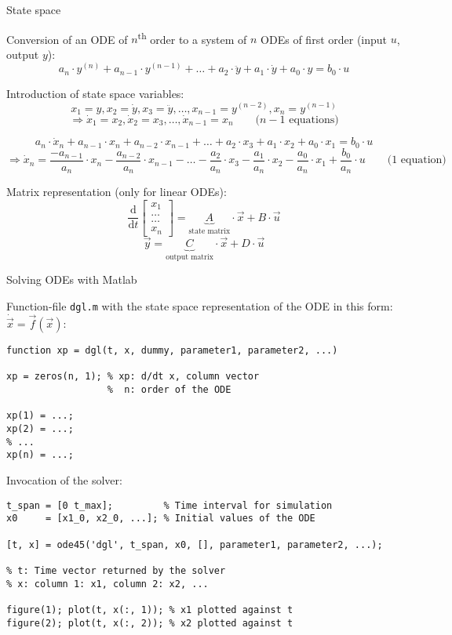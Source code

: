 \documentclass[a4paper,fontsize=11pt,parskip]{scrartcl}
\begin{document}
{\Large State space}

Conversion of an ODE of $n$\textsuperscript{th} order to a system of $n$ ODEs of first order (input $u$, output $y$):\\
\[a_n\cdot y^{(n)}+a_{n-1}\cdot y^{(n-1)}+\dots+a_2\cdot\ddot y+a_1\cdot\dot y+a_0\cdot y=b_0\cdot u\]

Introduction of state space variables:\\
\[x_1 = y, x_2 = \dot y, x_3 = \ddot y, \dots, x_{n-1} = y^{(n-2)}, x_n=y^{(n-1)}\]
\[\Rightarrow \dot x_1 = x_2, \dot x_2 = x_3, \dots, \dot x_{n-1} = x_n\qquad \text{(}n-1\text{ equations)}\]

\[a_n\cdot\dot x_n+a_{n-1}\cdot x_n+a_{n-2}\cdot x_{n-1}+\dots+a_2\cdot x_3+a_1\cdot x_2+a_0\cdot x_1=b_0\cdot u\]
\[\Rightarrow \dot x_n = \frac{-a_{n-1}}{a_n}\cdot x_n-\frac{a_{n-2}}{a_n}\cdot x_{n-1}-\dots-\frac{a_2}{a_n}\cdot x_3-\frac{a_1}{a_n}\cdot x_2-\frac{a_0}{a_n}\cdot x_1+\frac{b_0}{a_n}\cdot u\qquad \text{(1 equation)}\]

Matrix representation (only for linear ODEs):
\[\frac{\mathrm{d}}{\mathrm{d}t}\begin{bmatrix}x_1\\\dots\\\dots\\x_n\end{bmatrix}=\underbrace{A}_\text{state matrix}\cdot\vec x+B\cdot\vec u\]
\[\vec y=\underbrace{C}_\text{output matrix}\cdot\vec x+D\cdot\vec u\]

{\Large Solving ODEs with Matlab}

Function-file \texttt{dgl.m} with the state space representation of the ODE in this form: $\dot{\vec x}=\vec f(\vec x)$:
\begin{lstlisting}
function xp = dgl(t, x, dummy, parameter1, parameter2, ...)

xp = zeros(n, 1); % xp: d/dt x, column vector
                  %  n: order of the ODE

xp(1) = ...;
xp(2) = ...;
% ...
xp(n) = ...;
\end{lstlisting}

Invocation of the solver:
\begin{lstlisting}
t_span = [0 t_max];         % Time interval for simulation
x0     = [x1_0, x2_0, ...]; % Initial values of the ODE

[t, x] = ode45('dgl', t_span, x0, [], parameter1, parameter2, ...);

% t: Time vector returned by the solver
% x: column 1: x1, column 2: x2, ...

figure(1); plot(t, x(:, 1)); % x1 plotted against t
figure(2); plot(t, x(:, 2)); % x2 plotted against t
\end{lstlisting}
\end{document}
